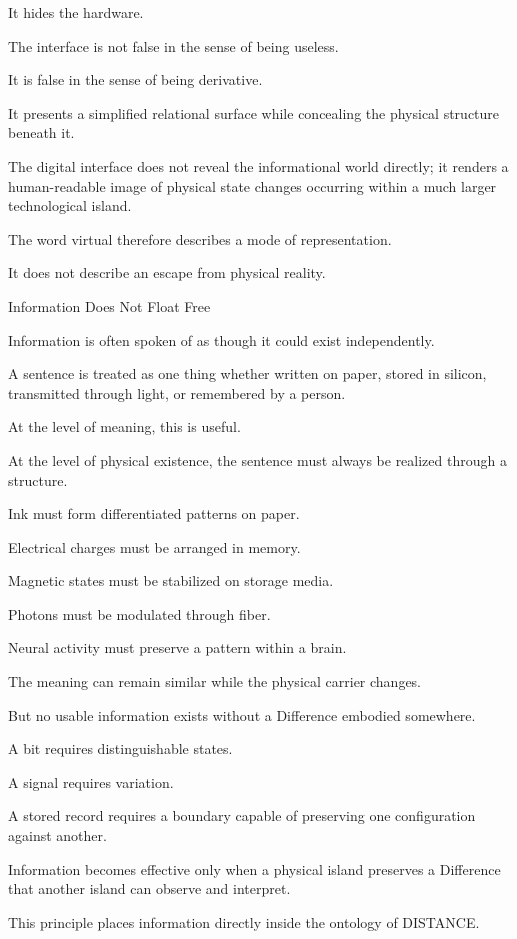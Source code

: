 It hides the hardware.

The interface is not false in the sense of being useless.

It is false in the sense of being derivative.

It presents a simplified relational surface while concealing the physical structure beneath it.

The digital interface does not reveal the informational world directly; it renders a human-readable image of physical state changes occurring within a much larger technological island.

The word virtual therefore describes a mode of representation.

It does not describe an escape from physical reality.

Information Does Not Float Free

Information is often spoken of as though it could exist independently.

A sentence is treated as one thing whether written on paper, stored in silicon, transmitted through light, or remembered by a person.

At the level of meaning, this is useful.

At the level of physical existence, the sentence must always be realized through a structure.

Ink must form differentiated patterns on paper.

Electrical charges must be arranged in memory.

Magnetic states must be stabilized on storage media.

Photons must be modulated through fiber.

Neural activity must preserve a pattern within a brain.

The meaning can remain similar while the physical carrier changes.

But no usable information exists without a Difference embodied somewhere.

A bit requires distinguishable states.

A signal requires variation.

A stored record requires a boundary capable of preserving one configuration against another.

Information becomes effective only when a physical island preserves a Difference that another island can observe and interpret.

This principle places information directly inside the ontology of DISTANCE.

